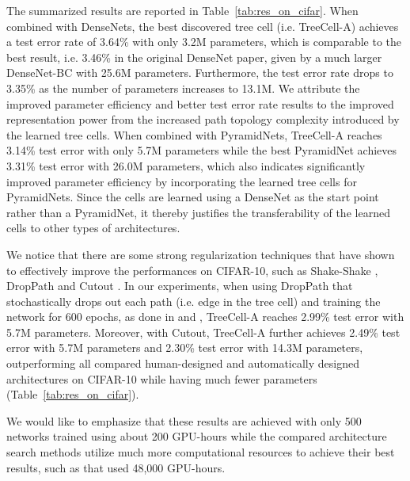 \documentclass{article}
\begin{document}
The summarized results are reported in Table~\ref{tab:res_on_cifar}. When combined with DenseNets, the best discovered tree cell (i.e. TreeCell-A) achieves a test error rate of 3.64\% with only 3.2M parameters, which is comparable to the best result, i.e. 3.46\% in the original DenseNet paper, given by a much larger DenseNet-BC with 25.6M parameters. Furthermore, the test error rate drops to 3.35\% as the number of parameters increases to 13.1M. We attribute the improved parameter efficiency and better test error rate results to the improved representation power from the increased path topology complexity introduced by the learned tree cells. 
When combined with PyramidNets, TreeCell-A reaches 3.14\% test error with only 5.7M parameters while the best PyramidNet achieves 3.31\% test error with 26.0M parameters, which also indicates significantly improved parameter efficiency by incorporating the learned tree cells for PyramidNets. Since the cells are learned using a DenseNet as the start point rather than a PyramidNet, it thereby justifies the transferability of the learned cells to other types of architectures. 

We notice that there are some strong regularization techniques that have shown to effectively improve the performances on CIFAR-10, such as Shake-Shake \cite{gastaldi2017shake}, DropPath \cite{zoph2017learning} and Cutout \cite{devries2017improved}. In our experiments, when using DropPath that stochastically drops out each path (i.e. edge in the tree cell) and training the network for 600 epochs, as done in \citet{zoph2017learning} and \citet{liu2017progressive}, TreeCell-A reaches 2.99\% test error with 5.7M parameters. Moreover, with Cutout, TreeCell-A further achieves 2.49\% test error with 5.7M parameters and 2.30\% test error with 14.3M parameters, outperforming all compared human-designed and automatically designed architectures on CIFAR-10 while having much fewer parameters (Table~\ref{tab:res_on_cifar}). 

We would like to emphasize that these results are achieved with only 500 networks trained using about 200 GPU-hours while the compared architecture search methods utilize much more computational resources to achieve their best results, such as \citet{zoph2017learning} that used 48,000 GPU-hours. 
\end{document}
